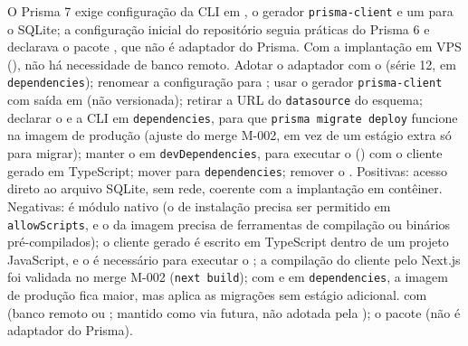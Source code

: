 {O Prisma 7 exige configuração da CLI em , o gerador \texttt{prisma-client} e um  para o SQLite; a configuração inicial do repositório seguia práticas do Prisma 6 e declarava o pacote , que não é adaptador do Prisma. Com a implantação em VPS (), não há necessidade de banco remoto.}
{Adotar o adaptador  com o  (série 12, em \texttt{dependencies}); renomear a configuração para ; usar o gerador \texttt{prisma-client} com saída em  (não versionada); retirar a URL do \texttt{datasource} do esquema; declarar o  e a CLI  em \texttt{dependencies}, para que \texttt{prisma migrate deploy} funcione na imagem de produção (ajuste do merge M-002, em vez de um estágio extra só para migrar); manter o  em \texttt{devDependencies}, para executar o  () com o cliente gerado em TypeScript; mover  para \texttt{dependencies}; remover o .}
{Positivas: acesso direto ao arquivo SQLite, sem rede, coerente com a implantação em contêiner. Negativas:  é módulo nativo (o  de instalação precisa ser permitido em \texttt{allowScripts}, e o  da imagem precisa de ferramentas de compilação ou binários pré-compilados); o cliente gerado é escrito em TypeScript dentro de um projeto JavaScript, e o  é necessário para executar o ; a compilação do cliente pelo Next.js foi validada no merge M-002 (\texttt{next build}); com  e  em \texttt{dependencies}, a imagem de produção fica maior, mas aplica as migrações sem estágio adicional.}
{ com  (banco remoto ou ; mantido como via futura, não adotada pela ); o pacote  (não é adaptador do Prisma).}

